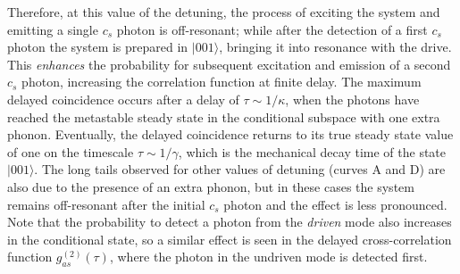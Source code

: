 Therefore, at this value of the detuning,
the process of
exciting the system and emitting a single $c_s$ photon
is off-resonant;
while after the detection of a first $c_s$ photon
the system is prepared in $|001\rangle$, bringing
it into resonance with the drive.
This {\it enhances}
the probability for subsequent excitation and emission
of a second $c_s$ photon, increasing
the correlation function at finite delay.
The maximum delayed coincidence
occurs after a delay of $\tau \sim 1/\kappa$,
when the photons have reached the
metastable steady state
in the conditional  subspace with one 
extra phonon.
Eventually, the delayed coincidence
returns to its true steady state value
of one
on the timescale
$\tau \sim 1/\gamma$, which is the mechanical decay time of the
state $|001\rangle$. 
The long tails
observed for other values of detuning (curves A and D) are
also
due to the presence of an extra phonon,
but in these cases the system remains off-resonant
after the initial $c_s$ photon and the effect is less
 pronounced.
Note that the
probability  to detect a photon from the {\it driven} mode also increases in 
the conditional state, so a similar effect is seen in the delayed 
cross-correlation function $g^{(2)}_{as}(\tau)$, where the photon in the 
undriven mode is detected first.




